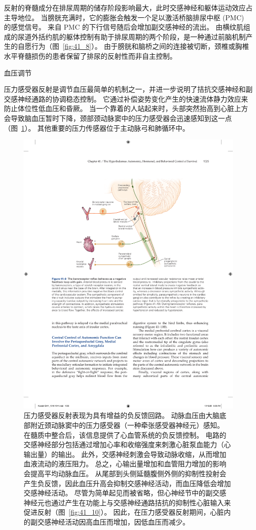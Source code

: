 反射的脊髓成分在排尿周期的储存阶段影响最大，此时交感神经和躯体运动效应占主导地位。
当膀胱充满时，它的膨胀会触发一个足以激活桥脑排尿中枢 (PMC) 的感觉信号。
来自 PMC 的下行信号随后会增加副交感神经的流出。
由横纹肌组成的尿道外括约肌的躯体控制有助于排尿周期的两个阶段，是一种通过前脑机制产生的自愿行为（图~\ref{fig:41_8}）。
由于膀胱和脑桥之间的连接被切断，颈椎或胸椎水平脊髓损伤的患者保留了排尿的反射性而非自主控制。


血压调节

压力感受器反射是调节血压最简单的机制之一，并进一步说明了拮抗交感神经和副交感神经通路的协调稳态控制。
它通过补偿姿势变化产生的快速流体静力效应来防止体位性低血压和昏厥。
当一个靠着的人站起来时，头部突然抬高到心脏上方会导致脑血压暂时下降，颈部颈动脉窦中的压力感受器会迅速感知到这一点（图~\ref{fig:41_9}）。
其他重要的压力传感器位于主动脉弓和肺循环中。


\begin{figure}[htbp]
	\centering
	\includegraphics[width=0.7\linewidth]{chap41/fig_41_9}
	\caption{压力感受器反射表现为具有增益的负反馈回路。 动脉血压由大脑底部附近颈动脉窦中的压力感受器（一种牵张感受器神经元）感知。 在髓质中整合后，该信息提供了心血管系统的负反馈控制。 电路的交感神经部分包括通过增加心率和收缩强度来刺激心脏泵血能力（心输出量）的输出。 此外，交感神经刺激会导致动脉收缩，从而增加血液流动的液压阻力。 总之，心输出量增加和血管阻力增加的影响会提高平均动脉血压。 从尾部到头侧延髓腹侧外侧的抑制性投射会产生负反馈，因此血压升高会抑制交感神经活动，而血压降低会增加交感神经活动。 尽管为简单起见而被省略，但心神经节中的副交感神经元也通过产生在功能上与交感神经通路拮抗的抑制性心脏输入来促进反射（图~\ref{fig:41_10}）。 因此，在压力感受器反射期间，心脏内的副交感神经活动因高血压而增加，因低血压而减少。}
	\label{fig:41_9}
\end{figure}



